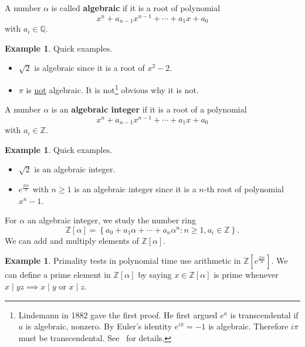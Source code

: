 \documentclass{amsbook}
\theoremstyle{plain}
\theoremstyle{definition}
\newtheorem{example}[theorem]{Example}
\theoremstyle{remark}
\numberwithin{equation}{chapter}
\numberwithin{figure}{chapter}
\newcommand{\Q}{\mathbb{Q}}
\newcommand{\Z}{\mathbb{Z}}
\begin{document}
A number $\alpha$ is called \textbf{algebraic} if it is a root of polynomial
\[
  x^n + a_{n-1} x^{n-1} +  \cdots + a_1 x + a_0
\]
with $a_i \in \Q$.
\begin{example}
  Quick examples.
  \begin{itemize}
  \item $\sqrt 2$ is algebraic since it is a root of $x^2 - 2$.
  \item $\pi$ is \underline{not} algebraic. It is not\footnote{Lindemann in 1882 gave the first proof. He first argued $e^a$ is transcendental if $a$ is algebraic, nonzero. By Euler's identity $e^{i \pi} = -1$ is algebraic. Therefore $i \pi$ must be transcendental. See~\cite{Lindemann1882} for details.} obvious why it is not.
  \end{itemize}
\end{example}
A number $\alpha$ is an \textbf{algebraic integer} if it is a root of a polynomial 
\[
  x^n + a_{n-1} x^{n-1} +  \cdots + a_1 x + a_0
\]
with $a_i \in \Z$.
\begin{example}
  Quick examples.
  \begin{itemize}
  \item $\sqrt 2$ is an algebraic integer.
  \item $e^{\frac{2 \pi i}n}$ with $n \geqslant 1$ is an algebraic integer since it is a $n$-th root of polynomial $x^n - 1$.
  \end{itemize}
\end{example}

For $\alpha$ an algebraic integer, we study the number ring
\[
  \Z[\alpha] = \left\{ a_0 + a_1 \alpha + \cdots + a_n \alpha^n : n \geqslant 1, a_i \in \Z \right\}.
\]
We can add and multiply elements of $\Z [\alpha]$.
\begin{example}\label{ex:prime_Za}
  Primality tests in polynomial time use arithmetic in $\Z \left[ e^{\frac{2 \pi i}n} \right]$. We can define a prime element in $\Z [\alpha]$ by saying $x \in \Z [\alpha]$ is prime whenever $x \mid yz \implies x \mid y$ or $x \mid z$.
\end{example}
\end{document}

